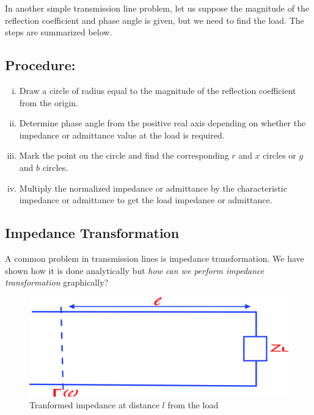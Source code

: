 In another simple transmission line problem, let us suppose the magnitude of the reflection coefficient and phase angle is given, but we need to find the load. The steps are summarized below.
\subsection*{Procedure:}
\begin{enumerate}[(i)]
\item Draw a circle of radius equal to the magnitude of the reflection coefficient from the origin.
\item Determine phase angle from the positive real axis depending on whether the impedance or admittance value at the load is required.
\item Mark the point on the circle and find the corresponding $r$ and $x$ circles or $g$ and $b$ circles.
\item Multiply the normalized impedance or admittance by the characteristic impedance or admittance to get the load impedance or admittance.
\end{enumerate}

\subsection{Impedance Transformation}
A common problem in transmission lines is impedance transformation. We have shown how it is done analytically but \emph{how can we perform impedance transformation}  graphically? 
\begin{figure}[h]
\centering
\includegraphics[width=0.7\linewidth]{graphics/wertuyuk}
\caption{Tranformed impedance at distance $l$ from the load}
\label{fig:wertuyuk}
\end{figure}


